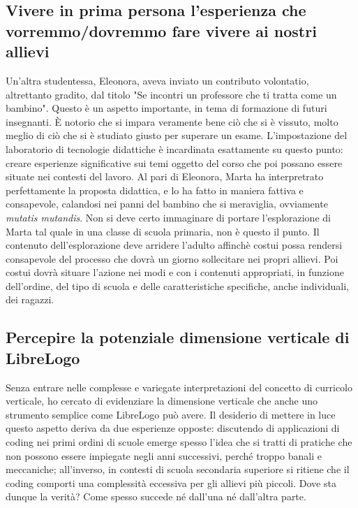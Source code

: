 \subsection{Vivere in prima persona l'esperienza che vorremmo/dovremmo fare vivere ai
nostri allievi}

Un'altra studentessa, Eleonora, aveva inviato un contributo volontatio, altrettanto
gradito, dal titolo "Se incontri un professore che ti tratta come un bambino". Questo è un
aspetto importante, in tema di formazione di futuri insegnanti. È notorio che
si impara veramente bene ciò che si è vissuto, molto meglio di ciò che si è
studiato giusto per superare un esame. L'impostazione del laboratorio di
tecnologie didattiche è incardinata esattamente su questo punto: creare
esperienze significative sui temi oggetto del corso che poi possano essere
situate nei contesti del lavoro. Al pari di Eleonora, Marta ha interpretrato perfettamente la proposta didattica, e lo ha fatto in maniera fattiva e consapevole, calandosi nei panni del bambino che si meraviglia, ovviamente \textit{mutatis mutandis}. Non si deve certo immaginare di portare l'esplorazione di Marta tal quale in una classe di scuola primaria, non è questo il punto. Il contenuto dell'esplorazione deve arridere l'adulto affinchè costui possa rendersi consapevole del processo che dovrà un giorno sollecitare nei propri allievi. Poi costui dovrà situare l'azione nei modi e con i contenuti appropriati, in funzione dell'ordine, del tipo di scuola e delle caratteristiche specifiche, anche individuali, dei ragazzi.

\subsection{Percepire la potenziale dimensione verticale di LibreLogo}

Senza entrare nelle complesse e variegate interpretazioni del concetto di curricolo verticale, ho cercato di evidenziare la dimensione verticale che anche uno strumento semplice come LibreLogo può avere. Il desiderio di mettere in luce questo aspetto deriva da due esperienze opposte: discutendo di applicazioni di coding nei primi ordini di scuole emerge spesso l'idea che si tratti di pratiche che non possono essere impiegate negli anni successivi, perché troppo banali e meccaniche; all'inverso, in contesti di scuola secondaria superiore si ritiene che il coding comporti una complessità eccessiva per gli allievi più piccoli. Dove sta dunque la verità? Come spesso succede né dall'una né dall'altra parte.

